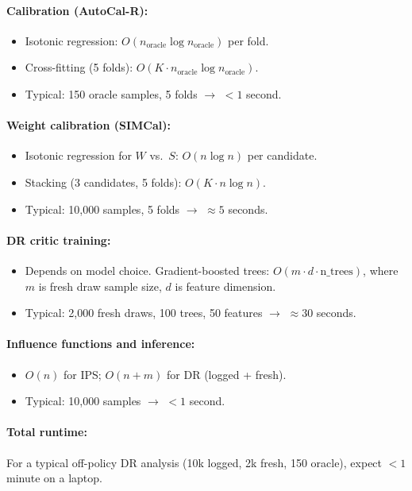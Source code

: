 \paragraph{Calibration (AutoCal-R):}
\begin{itemize}
\item Isotonic regression: $O(n_{\text{oracle}} \log n_{\text{oracle}})$ per fold.
\item Cross-fitting (5 folds): $O(K \cdot n_{\text{oracle}} \log n_{\text{oracle}})$.
\item Typical: 150 oracle samples, 5 folds $\to$ $< 1$ second.
\end{itemize}

\paragraph{Weight calibration (SIMCal):}
\begin{itemize}
\item Isotonic regression for $W$ vs.\ $S$: $O(n \log n)$ per candidate.
\item Stacking (3 candidates, 5 folds): $O(K \cdot n \log n)$.
\item Typical: 10,000 samples, 5 folds $\to$ $\approx 5$ seconds.
\end{itemize}

\paragraph{DR critic training:}
\begin{itemize}
\item Depends on model choice. Gradient-boosted trees: $O(m \cdot d \cdot \text{n\_trees})$, where $m$ is fresh draw sample size, $d$ is feature dimension.
\item Typical: 2,000 fresh draws, 100 trees, 50 features $\to$ $\approx 30$ seconds.
\end{itemize}

\paragraph{Influence functions and inference:}
\begin{itemize}
\item $O(n)$ for IPS; $O(n + m)$ for DR (logged + fresh).
\item Typical: 10,000 samples $\to$ $< 1$ second.
\end{itemize}

\paragraph{Total runtime:} For a typical off-policy DR analysis (10k logged, 2k fresh, 150 oracle), expect $< 1$ minute on a laptop.

